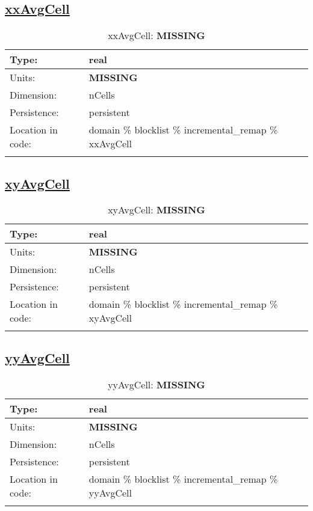 \subsection[xxAvgCell]{\hyperref[sec:var_tab_incremental_remap]{xxAvgCell}}
\label{subsec:var_sec_incremental_remap_xxAvgCell}
\begin{center}
\begin{longtable}{| p{2.0in} | p{4.0in} |}
        \hline 
        Type: & real \\
        \hline 
        Units: & {\bf \color{red} MISSING} \\
        \hline 
        Dimension: & nCells \\
        \hline 
        Persistence: & persistent \\
        \hline 
         Location in code: & domain \% blocklist \% incremental\_remap \% xxAvgCell \\
         \hline 
    \caption{xxAvgCell: {\bf \color{red} MISSING}}
\end{longtable}
\end{center}
\subsection[xyAvgCell]{\hyperref[sec:var_tab_incremental_remap]{xyAvgCell}}
\label{subsec:var_sec_incremental_remap_xyAvgCell}
\begin{center}
\begin{longtable}{| p{2.0in} | p{4.0in} |}
        \hline 
        Type: & real \\
        \hline 
        Units: & {\bf \color{red} MISSING} \\
        \hline 
        Dimension: & nCells \\
        \hline 
        Persistence: & persistent \\
        \hline 
         Location in code: & domain \% blocklist \% incremental\_remap \% xyAvgCell \\
         \hline 
    \caption{xyAvgCell: {\bf \color{red} MISSING}}
\end{longtable}
\end{center}
\subsection[yyAvgCell]{\hyperref[sec:var_tab_incremental_remap]{yyAvgCell}}
\label{subsec:var_sec_incremental_remap_yyAvgCell}
\begin{center}
\begin{longtable}{| p{2.0in} | p{4.0in} |}
        \hline 
        Type: & real \\
        \hline 
        Units: & {\bf \color{red} MISSING} \\
        \hline 
        Dimension: & nCells \\
        \hline 
        Persistence: & persistent \\
        \hline 
         Location in code: & domain \% blocklist \% incremental\_remap \% yyAvgCell \\
         \hline 
    \caption{yyAvgCell: {\bf \color{red} MISSING}}
\end{longtable}
\end{center}
